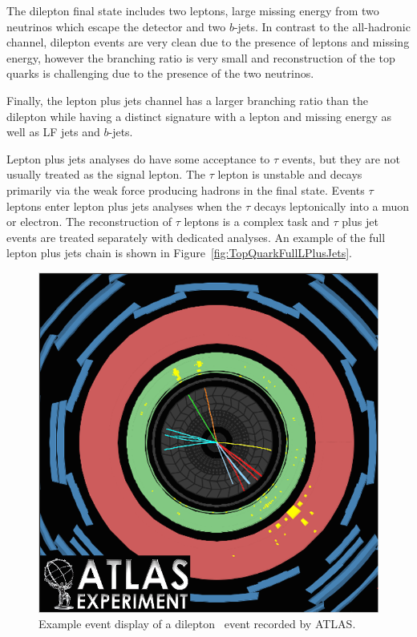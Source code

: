 The dilepton final state includes two leptons, large missing energy from two neutrinos which escape the detector and two $b$-jets. In contrast to the all-hadronic channel, dilepton events are very clean due to the presence of leptons and missing energy, however the branching ratio is very small and reconstruction of the top quarks is challenging due to the presence of the two neutrinos.

Finally, the lepton plus jets channel has a larger branching ratio than the dilepton while having a distinct signature with a lepton and missing energy as well as LF jets and $b$-jets.

Lepton plus jets analyses do have some acceptance to $\tau$ events, but they are not usually treated as the signal lepton. The $\tau$ lepton is unstable and decays primarily via the weak force producing hadrons in the final state. Events $\tau$ leptons enter lepton plus jets analyses when the $\tau$ decays leptonically into a muon or electron. The reconstruction of $\tau$ leptons is a complex task and $\tau$ plus jet events are treated separately with dedicated analyses. An example of the full lepton plus jets chain is shown in Figure~\ref{fig:TopQuarkFullLPlusJets}.

\begin{figure}[thbp]
  \centering
  \includegraphics[height=0.35\textheight]{PartTopQuark/Diagrams/atlas-2010-063-fig_09.png}
  \caption{Example event display of a dilepton \ttbar\ event recorded by ATLAS.}\label{fig:TopQuarkEventDisplay}
\end{figure}

